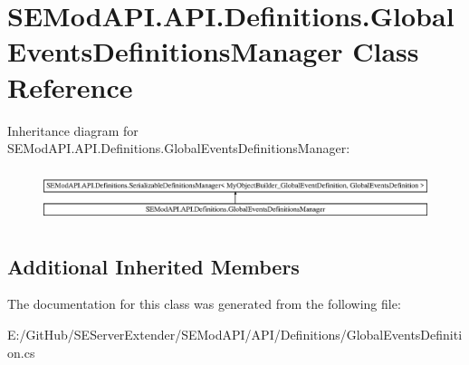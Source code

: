 \hypertarget{class_s_e_mod_a_p_i_1_1_a_p_i_1_1_definitions_1_1_global_events_definitions_manager}{}\section{S\+E\+Mod\+A\+P\+I.\+A\+P\+I.\+Definitions.\+Global\+Events\+Definitions\+Manager Class Reference}
\label{class_s_e_mod_a_p_i_1_1_a_p_i_1_1_definitions_1_1_global_events_definitions_manager}
Inheritance diagram for S\+E\+Mod\+A\+P\+I.\+A\+P\+I.\+Definitions.\+Global\+Events\+Definitions\+Manager\+:\begin{figure}[H]
\begin{center}
\leavevmode
\includegraphics[height=1.532148cm]{class_s_e_mod_a_p_i_1_1_a_p_i_1_1_definitions_1_1_global_events_definitions_manager}
\end{center}
\end{figure}
\subsection*{Additional Inherited Members}


The documentation for this class was generated from the following file\+:\begin{DoxyCompactItemize}
\item 
E\+:/\+Git\+Hub/\+S\+E\+Server\+Extender/\+S\+E\+Mod\+A\+P\+I/\+A\+P\+I/\+Definitions/Global\+Events\+Definition.\+cs\end{DoxyCompactItemize}
